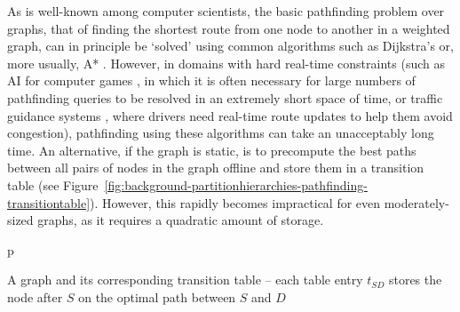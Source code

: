 As is well-known among computer scientists, the basic pathfinding problem over graphs, that of finding the shortest route from one node to another in a weighted graph, can in principle be `solved' using common algorithms such as Dijkstra's or, more usually, A* \cite{aima}. However, in domains with hard real-time constraints (such as AI for computer games \cite{dickheiser04,vandersterren04}, in which it is often necessary for large numbers of pathfinding queries to be resolved in an extremely short space of time, or traffic guidance systems \cite{jing96,jung96,kim98}, where drivers need real-time route updates to help them avoid congestion), pathfinding using these algorithms can take an unacceptably long time. An alternative, if the graph is static, is to precompute the best paths between all pairs of nodes in the graph offline and store them in a transition table (see Figure~\ref{fig:background-partitionhierarchies-pathfinding-transitiontable}). However, this rapidly becomes impractical for even moderately-sized graphs, as it requires a quadratic amount of storage.

\begin{stusubfig}{p}
	\hspace{4mm}%
\caption{A graph and its corresponding transition table -- each table entry $t_{SD}$ stores the node after $S$ on the optimal path between $S$ and $D$}
\label{fig:background-partitionhierarchies-pathfinding-transitiontable}
\end{stusubfig}

